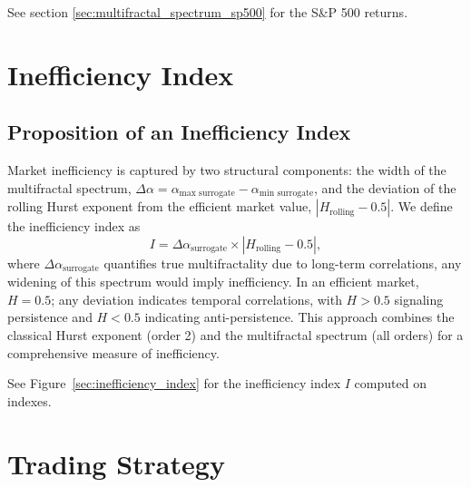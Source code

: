 \documentclass[11pt]{extarticle}
\begin{document}
See section \ref{sec:multifractal_spectrum_sp500} for the S\&P 500 returns.

\section{Inefficiency Index}
\subsection{Proposition of an Inefficiency Index}
\label{subsec:inefficiency_index}

Market inefficiency is captured by two structural components: the width of the multifractal spectrum,
 $\Delta\alpha = \alpha_{\text{max surrogate}} - \alpha_{\text{min surrogate}}$, and the deviation of the rolling Hurst
 exponent from the efficient market value, $|H_{\text{rolling}} - 0.5|$. We define the inefficiency index as
\begin{equation}
I = \Delta\alpha_{\text{surrogate}} \times |H_{\text{rolling}} - 0.5|,
\end{equation}
where $\Delta\alpha_{\text{surrogate}}$ quantifies true multifractality due to long-term correlations, any widening of this spectrum would imply inefficiency.
In an efficient market, $H = 0.5$; any deviation indicates temporal correlations, with $H > 0.5$ signaling persistence
and $H < 0.5$ indicating anti-persistence. This approach combines the classical Hurst exponent (order 2) and the multifractal
spectrum (all orders) for a comprehensive measure of inefficiency.

See Figure~\ref{sec:inefficiency_index} for the inefficiency index $I$ computed on indexes.


\section{Trading Strategy}
\end{document}
